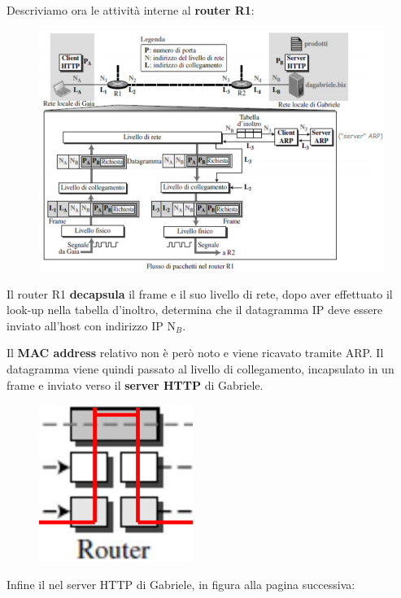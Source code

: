 \documentclass[11pt,a4paper,oneside]{book}
\theoremstyle{definition}
\begin{document}
\pagebreak

Descriviamo ora le attività interne al \textbf{router R1}:

\begin{figure}[!h]
	\includegraphics[scale=0.5]{Immagini/ARPexample1.png}
	\centering
\end{figure}

Il router R1 \textbf{decapsula} il frame e il suo livello di rete, dopo aver effettuato il look-up nella tabella d'inoltro, determina che il datagramma IP deve essere inviato all'host con indirizzo IP N$_{B}$.

Il \textbf{MAC address} relativo non è però noto e viene ricavato tramite ARP. Il datagramma viene quindi passato al livello di collegamento, incapsulato in un frame e inviato verso il \textbf{server HTTP} di Gabriele.

\begin{figure}[!h]
	\includegraphics[scale=0.35]{Immagini/Router_model.png}
	\centering
\end{figure}

Infine il nel server HTTP di Gabriele, in figura alla pagina successiva:
\end{document}

